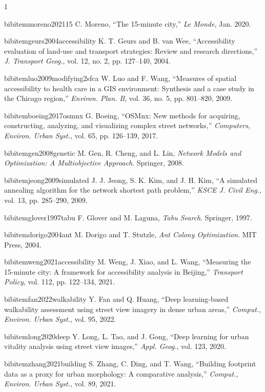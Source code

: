 \documentclass[journal]{IEEEtran}
\begin{document}
\begin{thebibliography}{1}

 bibitem{moreno202115}
 C. Moreno, ``The 15-minute city,'' \emph{Le Monde}, Jan. 2020.

 bibitem{geurs2004accessibility}
 K. T. Geurs and B. van Wee, ``Accessibility evaluation of land-use and transport strategies: Review and research directions,'' \emph{J. Transport Geog.}, vol. 12, no. 2, pp. 127--140, 2004.

 bibitem{luo2009modifying2sfca}
 W. Luo and F. Wang, ``Measures of spatial accessibility to health care in a GIS environment: Synthesis and a case study in the Chicago region,'' \emph{Environ. Plan. B}, vol. 36, no. 5, pp. 801--820, 2009.

 bibitem{boeing2017osmnx}
 G. Boeing, ``OSMnx: New methods for acquiring, constructing, analyzing, and visualizing complex street networks,'' \emph{Computers, Environ. Urban Syst.}, vol. 65, pp. 126--139, 2017.

 bibitem{gen2008genetic}
 M. Gen, R. Cheng, and L. Lin, \emph{Network Models and Optimization: A Multiobjective Approach}. Springer, 2008.

 bibitem{jeong2009simulated}
 J. J. Jeong, S. K. Kim, and J. H. Kim, ``A simulated annealing algorithm for the network shortest path problem,'' \emph{KSCE J. Civil Eng.}, vol. 13, pp. 285--290, 2009.

 bibitem{glover1997tabu}
 F. Glover and M. Laguna, \emph{Tabu Search}. Springer, 1997.

 bibitem{dorigo2004ant}
 M. Dorigo and T. Stutzle, \emph{Ant Colony Optimization}. MIT Press, 2004.

 bibitem{weng2021accessibility}
 M. Weng, J. Xiao, and L. Wang, ``Measuring the 15-minute city: A framework for accessibility analysis in Beijing,'' \emph{Transport Policy}, vol. 112, pp. 122--134, 2021.

 bibitem{fan2022walkability}
 Y. Fan and Q. Huang, ``Deep learning-based walkability assessment using street view imagery in dense urban areas,'' \emph{Comput., Environ. Urban Syst.}, vol. 95, 2022.

 bibitem{long2020deep}
 Y. Long, L. Tao, and J. Gong, ``Deep learning for urban vitality analysis using street view images,'' \emph{Appl. Geog.}, vol. 123, 2020.

 bibitem{zhang2021building}
 S. Zhang, C. Ding, and T. Wang, ``Building footprint data as a proxy for urban morphology: A comparative analysis,'' \emph{Comput., Environ. Urban Syst.}, vol. 89, 2021.


\end{thebibliography}
\end{document}
